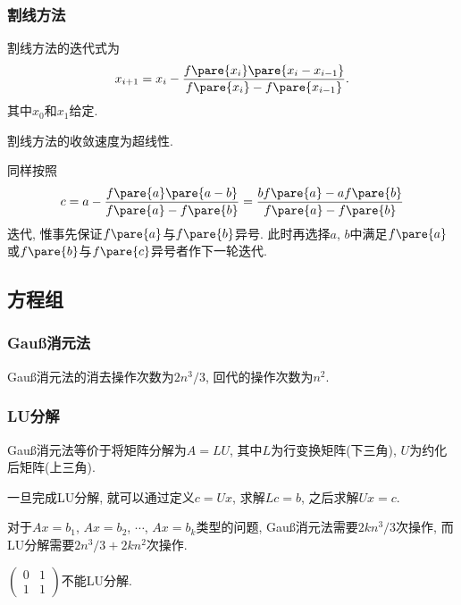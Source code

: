 \documentclass{ctexart}
\begin{document}

\subsubsection{割线方法} %
\label{ssub:割线方法}

\begin{theorem}
    割线方法的迭代式为
    \[ x_{i+1} = x_i - \frac{f\pare{x_i}\pare{x_i - x_{i-1}}}{f\pare{x_i} - f\pare{x_{i-1}}}. \]
    其中$x_0$和$x_1$给定.
\end{theorem}
割线方法的收敛速度为超线性.
\begin{theorem}
    同样按照
    \[ c = a - \frac{f\pare{a}\pare{a-b}}{f\pare{a} - f\pare{b}} = \frac{bf\pare{a} - af\pare{b}}{f\pare{a} - f\pare{b}} \]
    迭代, 惟事先保证$f\pare{a}$与$f\pare{b}$异号. 此时再选择$a$, $b$中满足$f\pare{a}$或$f\pare{b}$与$f\pare{c}$异号者作下一轮迭代.
\end{theorem}



\subsection{方程组} %
\label{sub:方程组}

\subsubsection{\texorpdfstring{Gau\ss}{Gauss}消元法} %
\label{ssub:gauss消元法}

Gau\ss 消元法的消去操作次数为$2n^3/3$, 回代的操作次数为$n^2$.


\subsubsection{LU分解} %
\label{ssub:lu分解}

Gau\ss 消元法等价于将矩阵分解为$A=LU$, 其中$L$为行变换矩阵(下三角), $U$为约化后矩阵(上三角).
\par
一旦完成LU分解, 就可以通过定义$c=Ux$, 求解$Lc=b$, 之后求解$Ux=c$.
\par
对于$Ax=b_1$, $Ax=b_2$, $\cdots$, $Ax=b_k$类型的问题, Gau\ss 消元法需要$2kn^3/3$次操作, 而LU分解需要$2n^3/3 + 2kn^2$次操作.
\begin{ex}[并非所有矩阵都有LU分解]
    $\displaystyle \begin{pmatrix}
        0 & 1 \\ 1 & 1
    \end{pmatrix}$不能LU分解.
\end{ex}
\end{document}
